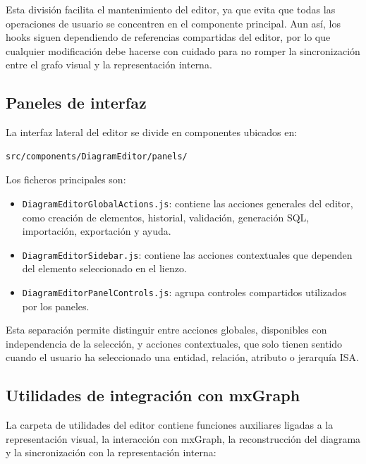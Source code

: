 Esta división facilita el mantenimiento del editor, ya que evita que todas las operaciones de usuario se concentren en el componente principal. Aun así, los hooks siguen dependiendo de referencias compartidas del editor, por lo que cualquier modificación debe hacerse con cuidado para no romper la sincronización entre el grafo visual y la representación interna.

\subsection{Paneles de interfaz}

La interfaz lateral del editor se divide en componentes ubicados en:

\begin{verbatim}
src/components/DiagramEditor/panels/
\end{verbatim}

Los ficheros principales son:

\begin{itemize}
\item \texttt{DiagramEditorGlobalActions.js}: contiene las acciones generales del editor, como creación de elementos, historial, validación, generación SQL, importación, exportación y ayuda.

\item \texttt{DiagramEditorSidebar.js}: contiene las acciones contextuales que dependen del elemento seleccionado en el lienzo.

\item \texttt{DiagramEditorPanelControls.js}: agrupa controles compartidos utilizados por los paneles.

\end{itemize}

Esta separación permite distinguir entre acciones globales, disponibles con independencia de la selección, y acciones contextuales, que solo tienen sentido cuando el usuario ha seleccionado una entidad, relación, atributo o jerarquía ISA.

\subsection{Utilidades de integración con mxGraph}

La carpeta de utilidades del editor contiene funciones auxiliares ligadas a la representación visual, la interacción con mxGraph, la reconstrucción del diagrama y la sincronización con la representación interna:

